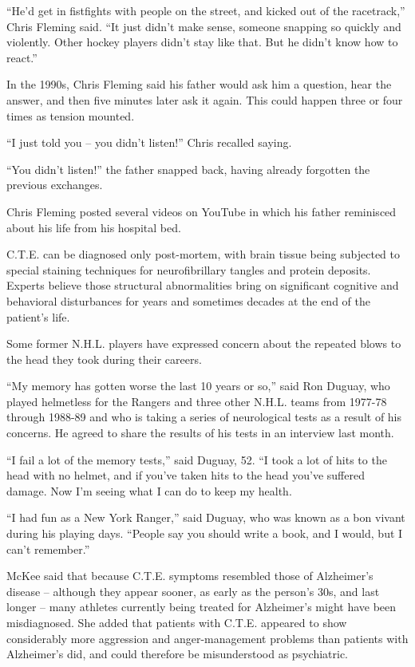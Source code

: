 ﻿\documentclass[12pt]{article}
\begin{document}
``He'd get in fistfights with people on the street, and kicked out of the racetrack,'' Chris Fleming
said. ``It just didn't make sense, someone snapping so quickly and violently. Other hockey players
didn't stay like that. But he didn't know how to react.''

In the 1990s, Chris Fleming said his father would ask him a question, hear the answer, and then five
minutes later ask it again. This could happen three or four times as tension mounted.

``I just told you -- you didn't listen!'' Chris recalled saying.

``You didn't listen!'' the father snapped back, having already forgotten the previous exchanges.

Chris Fleming posted several videos on YouTube in which his father reminisced about his life from
his hospital bed.

C.T.E. can be diagnosed only post-mortem, with brain tissue being subjected to special staining
techniques for neurofibrillary tangles and protein deposits. Experts believe those structural
abnormalities bring on significant cognitive and behavioral disturbances for years and sometimes
decades at the end of the patient's life.

Some former N.H.L. players have expressed concern about the repeated blows to the head they took
during their careers.

``My memory has gotten worse the last 10 years or so,'' said Ron Duguay, who played helmetless for
the Rangers and three other N.H.L. teams from 1977-78 through 1988-89 and who is taking a series of
neurological tests as a result of his concerns. He agreed to share the results of his tests in an
interview last month.

``I fail a lot of the memory tests,'' said Duguay, 52. ``I took a lot of hits to the head with no
helmet, and if you've taken hits to the head you've suffered damage. Now I'm seeing what I can do to
keep my health.

``I had fun as a New York Ranger,'' said Duguay, who was known as a bon vivant during his playing
days. ``People say you should write a book, and I would, but I can't remember.''

McKee said that because C.T.E. symptoms resembled those of Alzheimer's disease -- although they
appear sooner, as early as the person's 30s, and last longer -- many athletes currently being
treated for Alzheimer's might have been misdiagnosed. She added that patients with C.T.E. appeared
to show considerably more aggression and anger-management problems than patients with Alzheimer's
did, and could therefore be misunderstood as psychiatric.
\end{document}
